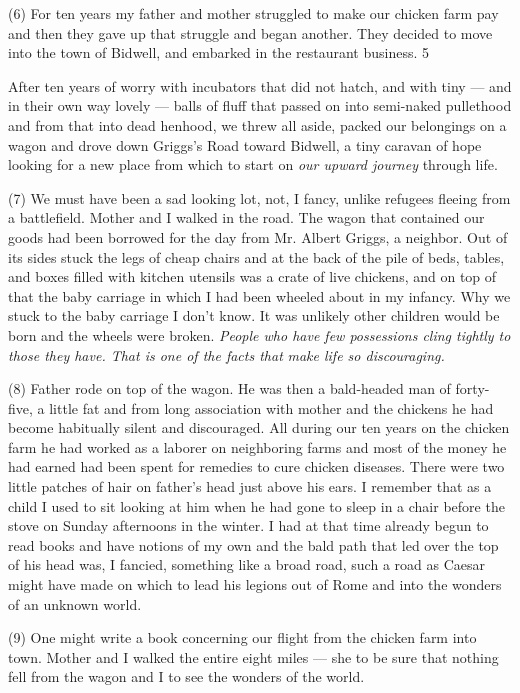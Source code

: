 \documentclass[UTF8,11pt]{ctexart}
\begin{document}
(6) For ten years my father and mother struggled to make our chicken farm pay and then they gave up that struggle and began another. They decided to move into the town of Bidwell, and embarked in the restaurant business. 5


After ten years of worry with incubators that did not hatch, and with tiny — and in their own way lovely — balls of fluff that passed on into semi-naked pullethood and from that into dead henhood, we threw all aside, packed our belongings on a wagon and drove down Griggs’s Road toward Bidwell, a tiny caravan of hope looking for a new place from which to start on \textit{our upward journey} through life.


(7) We must have been a sad looking lot, not, I fancy, unlike refugees fleeing from a battlefield. Mother and I walked in the road. The wagon that contained our goods had been borrowed for the day from Mr. Albert Griggs, a neighbor. Out of its sides stuck the legs of cheap chairs and at the back of the pile of beds, tables, and boxes filled with kitchen utensils was a crate of live chickens, and on top of that the baby carriage in which I had been wheeled about in my infancy. Why we stuck to the baby carriage I don’t know. It was unlikely other children would be born and the wheels were broken. \textit{People who have few possessions cling tightly to those they have. That is one of the facts that} \textit{make life so discouraging.}


(8) Father rode on top of the wagon. He was then a bald-headed man of forty-five, a little fat and from long association with mother and the chickens he had become habitually silent and discouraged. All during our ten years on the chicken farm he had worked as a laborer on neighboring farms and most of the money he had earned had been spent for remedies to cure chicken diseases. There were two little patches of hair on father’s head just above his ears. I remember that as a child I used to sit looking at him when he had gone to sleep in a chair before the stove on Sunday afternoons in the winter. I had at that time already begun to read books and have notions of my own and the bald path that led over the top of his head was, I fancied, something like a broad road, such a road as Caesar might have made on which to lead his legions out of Rome and into the wonders of an unknown world.


(9) One might write a book concerning our flight from the chicken farm into town. Mother and I walked the entire eight miles — she to be sure that nothing fell from the wagon and I to see the wonders of the world.
\end{document}
